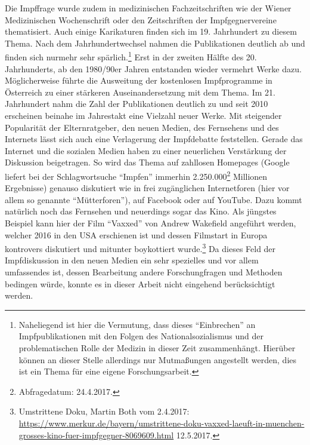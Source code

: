 \documentclass[
    a4paper,
    12pt,
    hyphens,
    chapterprefix=true,
    headheight=33pt,
    footheight=29pt,
    headings=optiontohead,
]{scrartcl}
\begin{document}
{ Die Impffrage wurde zudem in medizinischen Fachzeitschriften wie der Wiener Medizinischen Wochenschrift oder den Zeitschriften der Impfgegnervereine thematisiert. Auch einige Karikaturen finden sich im 19. Jahrhundert zu diesem Thema. Nach dem Jahrhundertwechsel nahmen die Publikationen deutlich ab und finden sich nurmehr sehr spärlich.\footnote{Naheliegend ist hier die Vermutung, dass dieses "`Einbrechen"' an Impfpublikationen mit den Folgen des Nationalsozialismus und der problematischen Rolle der Medizin in dieser Zeit zusammenhängt. Hierüber können an dieser Stelle allerdings nur Mutmaßungen angestellt werden, dies ist ein Thema für eine eigene Forschungsarbeit.} Erst in der zweiten Hälfte des 20. Jahrhunderts, ab den 1980/90er Jahren entstanden wieder vermehrt Werke dazu. Möglicherweise führte die Ausweitung der kostenlosen Impfprogramme in Österreich zu einer stärkeren Auseinandersetzung mit dem Thema. Im 21. Jahrhundert nahm die Zahl der Publikationen deutlich zu und seit 2010 erscheinen beinahe im Jahrestakt eine Vielzahl neuer Werke. Mit steigender Popularität der Elternratgeber, den neuen Medien, des Fernsehens und des Internets lässt sich auch eine Verlagerung der Impfdebatte feststellen. Gerade das Internet und die sozialen Medien haben zu einer neuerlichen Verstärkung der Diskussion beigetragen. So wird das Thema auf zahllosen Homepages (Google liefert bei der Schlagwortsuche "`Impfen"' immerhin 2.250.000\footnote{Abfragedatum: 24.4.2017.} Millionen Ergebnisse) genauso diskutiert wie in frei zugänglichen Internetforen (hier vor allem so genannte "`Mütterforen"'), auf Facebook oder auf YouTube. Dazu kommt natürlich noch das Fernsehen und neuerdings sogar das Kino. Als jüngstes Beispiel kann hier der Film "`Vaxxed"' von Andrew Wakefield angeführt werden, welcher 2016 in den USA erschienen ist und dessen Filmstart in Europa kontrovers diskutiert und mitunter boykottiert wurde.\footnote{Umstrittene Doku, Martin Both vom 2.4.2017: \url{https://www.merkur.de/bayern/umstrittene-doku-vaxxed-laeuft-in-muenchen-grosses-kino-fuer-impfgegner-8069609.html} 12.5.2017.} Da dieses Feld der Impfdiskussion in den neuen Medien ein sehr spezielles und vor allem umfassendes ist, dessen Bearbeitung andere Forschungfragen und Methoden bedingen würde, konnte es in dieser Arbeit nicht eingehend berücksichtigt werden.\\

}
\end{document}
